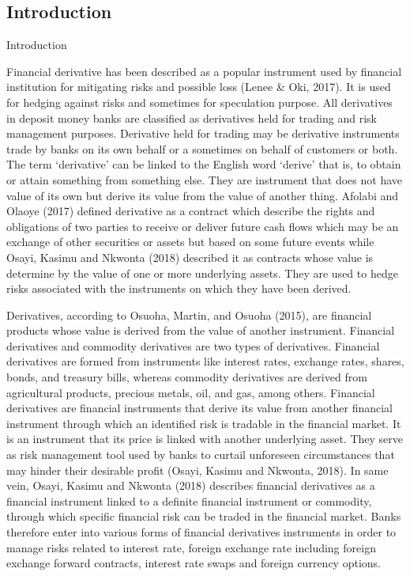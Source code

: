 \documentclass[unknownkeysallowed, compress]{beamer}
\theoremstyle{plain}
\begin{document}
\subsection{Introduction}
\begin{frame}[allowframebreaks]{Introduction}
    \noindent
\par Financial derivative has been described as a popular instrument used by financial
institution for mitigating risks and possible loss (Lenee \& Oki, 2017). It is used for hedging
against risks and sometimes for speculation purpose. All derivatives in deposit money
banks are classified as derivatives held for trading and risk management purposes.
Derivative held for trading may be derivative instruments trade by banks on its own
behalf or a sometimes on behalf of customers or both. The term 	`derivative' can be linked
to the English word `derive' that is, to obtain or attain something from something else.
They are instrument that does not have value of its own but derive its value from the
value of another thing. Afolabi and Olaoye (2017) defined derivative as a contract which
describe the rights and obligations of two parties to receive or deliver future cash flows
which may be an exchange of other securities or assets but based on some future events
while Osayi, Kasimu and Nkwonta (2018) described it as contracts whose value is
determine by the value of one or more underlying assets. They are used to hedge risks
associated with the instruments on which they have been derived.\\

\par Derivatives, according to Osuoha, Martin, and Osuoha (2015), are financial
products whose value is derived from the value of another instrument. Financial
derivatives and commodity derivatives are two types of derivatives. Financial derivatives
are formed from instruments like interest rates, exchange rates, shares, bonds, and
treasury bills, whereas commodity derivatives are derived from agricultural products,
precious metals, oil, and gas, among others. Financial derivatives are financial
instruments that derive its value from another financial instrument through which an
identified risk is tradable in the financial market. It is an instrument that its price is linked
with another underlying asset. They serve as risk management tool used by banks to
curtail unforeseen circumstances that may hinder their desirable profit (Osayi, Kasimu
and Nkwonta, 2018). In same vein, Osayi, Kasimu and Nkwonta (2018) describes financial
derivatives as a financial instrument linked to a definite financial instrument or
commodity, through which specific financial risk can be traded in the financial market.
Banks therefore enter into various forms of financial derivatives instruments in order to manage risks related to interest rate, foreign exchange rate including foreign exchange
forward contracts, interest rate swaps and foreign currency options.\\


\end{frame}
\end{document}
